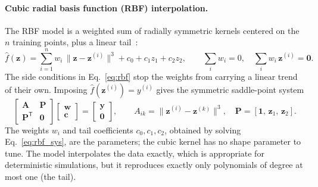 \paragraph{Cubic radial basis function (RBF) interpolation.} The RBF model is a weighted sum of radially symmetric kernels centered on the $n$ training points, plus a linear tail~\cite{buhmann2003}:
\begin{equation}
  \hat f(\mathbf{z})=\sum_{i=1}^{n}w_i\,\big\|\mathbf{z}-\mathbf{z}^{(i)}\big\|^3+c_0+c_1z_1+c_2z_2,
  \qquad \sum_i w_i=0,\quad \sum_i w_i\,\mathbf{z}^{(i)}=\mathbf{0}.
  \label{eq:rbf}
\end{equation}
The side conditions in Eq.~\eqref{eq:rbf} stop the weights from carrying a linear trend of their own. Imposing $\hat f(\mathbf{z}^{(i)})=y^{(i)}$ gives the symmetric saddle-point system
\begin{equation}
  \begin{bmatrix}\mathbf{A}&\mathbf{P}\\\mathbf{P}^{\mathsf T}&\mathbf{0}\end{bmatrix}
  \begin{bmatrix}\mathbf{w}\\\mathbf{c}\end{bmatrix}=
  \begin{bmatrix}\mathbf{y}\\\mathbf{0}\end{bmatrix},
  \qquad A_{ik}=\big\|\mathbf{z}^{(i)}-\mathbf{z}^{(k)}\big\|^3,\quad \mathbf{P}=[\mathbf{1},\,\mathbf{z}_1,\,\mathbf{z}_2].
  \label{eq:rbf_sys}
\end{equation}
The weights $w_i$ and tail coefficients $c_0,c_1,c_2$, obtained by solving Eq.~\eqref{eq:rbf_sys}, are the parameters; the cubic kernel has no shape parameter to tune. The model interpolates the data exactly, which is appropriate for deterministic simulations, but it reproduces exactly only polynomials of degree at most one (the tail).

